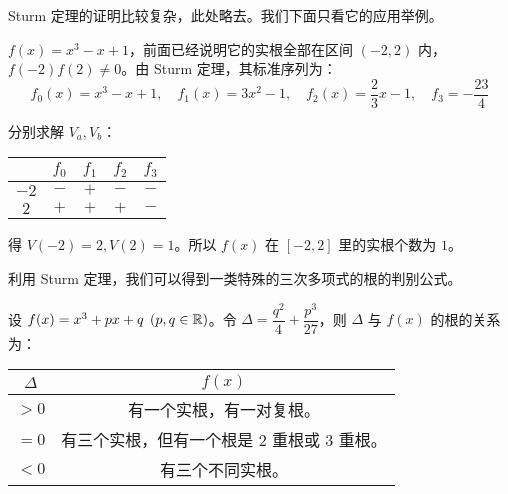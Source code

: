 Sturm 定理的证明比较复杂，此处略去。我们下面只看它的应用举例。

\begin{example}
	$f(x) = x^3 - x + 1$，前面已经说明它的实根全部在区间 $(-2, 2)$ 内，$f(-2) f(2) \ne 0$。由 Sturm 定理，其标准序列为：
	$$
	f_0(x) = x^3 - x + 1, \quad f_1(x) = 3x^2 - 1, \quad f_2(x) = \dfrac{2}{3} x - 1, \quad f_3 = -\dfrac{23}{4}
	$$

	分别求解 $V_a, V_b$：
	\begin{table}[H]
		\centering
		\begin{tabular}{c|cccc}\toprule
			& $f_0$ & $f_1$ & $f_2$ & $f_3$
			\\\hline
			$-2$ & $-$ & $+$ & $-$ & $-$
			\\
			$2$ & $+$ & $+$ & $+$ & $-$
			\\\bottomrule
		\end{tabular}
	\end{table}

	得 $V(-2) = 2, V(2) = 1$。所以 $f(x)$ 在 $[-2, 2]$ 里的实根个数为 $1$。
\end{example}

利用 Sturm 定理，我们可以得到一类特殊的三次多项式的根的判别公式。

\begin{proposition}
	设 $f(x) = x^3 + px + q \pod{p, q \in \mathbb R}$。令 $\Delta = \dfrac{q^2}{4} + \dfrac{p^3}{27}$，则 $\Delta$ 与 $f(x)$ 的根的关系为：
	\begin{table}[H]
		\centering
		\begin{tabular}{c|c}\toprule
			$\Delta$ & $f(x)$
			\\\hline
			$> 0$ & 有一个实根，有一对复根。
			\\
			$= 0$ & 有三个实根，但有一个根是 2 重根或 3 重根。
			\\
			$< 0$ & 有三个不同实根。
			\\\bottomrule
		\end{tabular}
	\end{table}
\end{proposition}

